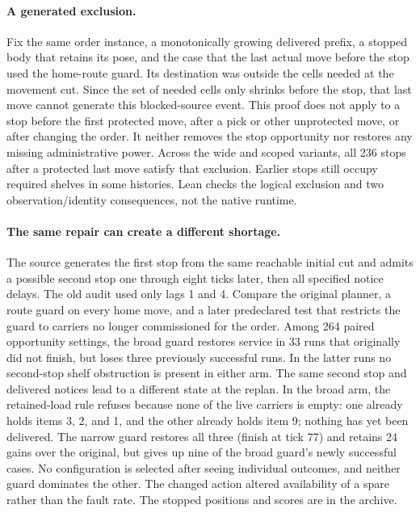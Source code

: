 \documentclass{article}
\begin{document}
\paragraph{A generated exclusion.}
Fix the same order instance, a monotonically growing delivered prefix, a stopped body that retains its pose, and the case that the last actual move before the stop used the home-route guard. Its destination was outside the cells needed at the movement cut. Since the set of needed cells only shrinks before the stop, that last move cannot generate this blocked-source event. This proof does not apply to a stop before the first protected move, after a pick or other unprotected move, or after changing the order. It neither removes the stop opportunity nor restores any missing administrative power. Across the wide and scoped variants, all 236 stops after a protected last move satisfy that exclusion. Earlier stops still occupy required shelves in some histories. Lean checks the logical exclusion and two observation/identity consequences, not the native runtime.

\paragraph{The same repair can create a different shortage.}
The source generates the first stop from the same reachable initial cut and admits a possible second stop one through eight ticks later, then all specified notice delays. The old audit used only lags 1 and 4. Compare the original planner, a route guard on every home move, and a later predeclared test that restricts the guard to carriers no longer commissioned for the order. Among 264 paired opportunity settings, the broad guard restores service in 33 runs that originally did not finish, but loses three previously successful runs. In the latter runs no second-stop shelf obstruction is present in either arm. The same second stop and delivered notices lead to a different state at the replan. In the broad arm, the retained-load rule refuses because none of the live carriers is empty: one already holds items 3, 2, and 1, and the other already holds item 9; nothing has yet been delivered. The narrow guard restores all three (finish at tick 77) and retains 24 gains over the original, but gives up nine of the broad guard's newly successful cases. No configuration is selected after seeing individual outcomes, and neither guard dominates the other. The changed action altered availability of a spare rather than the fault rate. The stopped positions and scores are in the archive.
\end{document}
